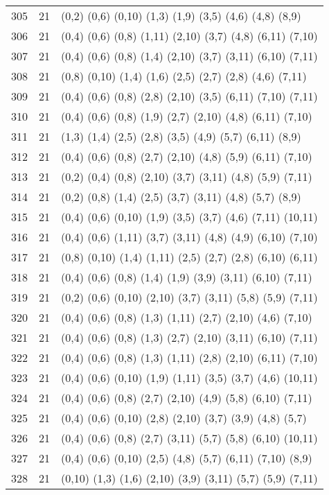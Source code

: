 {\begin{longtable}{lll}
305 & 21 & (0,2) (0,6) (0,10) (1,3) (1,9) (3,5) (4,6) (4,8) (8,9) \\
306 & 21 & (0,4) (0,6) (0,8) (1,11) (2,10) (3,7) (4,8) (6,11) (7,10) \\
307 & 21 & (0,4) (0,6) (0,8) (1,4) (2,10) (3,7) (3,11) (6,10) (7,11) \\
308 & 21 & (0,8) (0,10) (1,4) (1,6) (2,5) (2,7) (2,8) (4,6) (7,11) \\
309 & 21 & (0,4) (0,6) (0,8) (2,8) (2,10) (3,5) (6,11) (7,10) (7,11) \\
310 & 21 & (0,4) (0,6) (0,8) (1,9) (2,7) (2,10) (4,8) (6,11) (7,10) \\
311 & 21 & (1,3) (1,4) (2,5) (2,8) (3,5) (4,9) (5,7) (6,11) (8,9) \\
312 & 21 & (0,4) (0,6) (0,8) (2,7) (2,10) (4,8) (5,9) (6,11) (7,10) \\
313 & 21 & (0,2) (0,4) (0,8) (2,10) (3,7) (3,11) (4,8) (5,9) (7,11) \\
314 & 21 & (0,2) (0,8) (1,4) (2,5) (3,7) (3,11) (4,8) (5,7) (8,9) \\
315 & 21 & (0,4) (0,6) (0,10) (1,9) (3,5) (3,7) (4,6) (7,11) (10,11) \\
316 & 21 & (0,4) (0,6) (1,11) (3,7) (3,11) (4,8) (4,9) (6,10) (7,10) \\
317 & 21 & (0,8) (0,10) (1,4) (1,11) (2,5) (2,7) (2,8) (6,10) (6,11) \\
318 & 21 & (0,4) (0,6) (0,8) (1,4) (1,9) (3,9) (3,11) (6,10) (7,11) \\
319 & 21 & (0,2) (0,6) (0,10) (2,10) (3,7) (3,11) (5,8) (5,9) (7,11) \\
320 & 21 & (0,4) (0,6) (0,8) (1,3) (1,11) (2,7) (2,10) (4,6) (7,10) \\
321 & 21 & (0,4) (0,6) (0,8) (1,3) (2,7) (2,10) (3,11) (6,10) (7,11) \\
322 & 21 & (0,4) (0,6) (0,8) (1,3) (1,11) (2,8) (2,10) (6,11) (7,10) \\
323 & 21 & (0,4) (0,6) (0,10) (1,9) (1,11) (3,5) (3,7) (4,6) (10,11) \\
324 & 21 & (0,4) (0,6) (0,8) (2,7) (2,10) (4,9) (5,8) (6,10) (7,11) \\
325 & 21 & (0,4) (0,6) (0,10) (2,8) (2,10) (3,7) (3,9) (4,8) (5,7) \\
326 & 21 & (0,4) (0,6) (0,8) (2,7) (3,11) (5,7) (5,8) (6,10) (10,11) \\
327 & 21 & (0,4) (0,6) (0,10) (2,5) (4,8) (5,7) (6,11) (7,10) (8,9) \\
328 & 21 & (0,10) (1,3) (1,6) (2,10) (3,9) (3,11) (5,7) (5,9) (7,11) \\

\end{longtable}}
